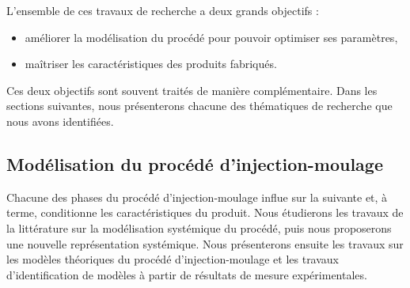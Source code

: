 \noindent
L'ensemble de ces travaux de recherche a deux grands objectifs :
\begin{itemize}
	\item améliorer la modélisation du procédé pour pouvoir optimiser ses paramètres,
	\item maîtriser les caractéristiques des produits fabriqués.
\end{itemize}
Ces deux objectifs sont souvent traités de manière complémentaire.
Dans les sections suivantes, nous présenterons chacune des thématiques de recherche que nous avons identifiées.

\subsection{Modélisation du procédé d'injection-moulage} \label{subsec:molding_model}
Chacune des phases du procédé d'injection-moulage influe sur la suivante et, à terme, conditionne les caractéristiques du produit.
Nous étudierons les travaux de la littérature sur la modélisation systémique du procédé, puis nous proposerons une nouvelle représentation systémique.
Nous présenterons ensuite les travaux sur les modèles théoriques du procédé d'injection-moulage et les travaux d'identification de modèles à partir de résultats de mesure expérimentales.

